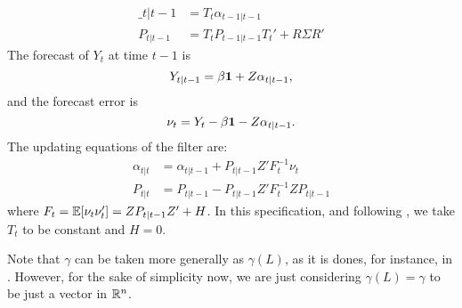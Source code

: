 \begin{align}
	\_{t|t-1} &= T_t \alpha_{t-1|t-1}\\
	P_{t|t-1} &= T_t P_{t-1|t-1}T_t' + R\Sigma R'
\end{align}
The forecast of $Y_t$ at time $t-1$ is $$Y_{t|t-1} = \beta\mathbf{1} + Z\alpha_{t|t-1},$$ and the forecast error is $$\nu_t=Y_t-\beta\mathbf{1} - Z\alpha_{t|t-1}.$$ The updating equations of the filter are:
\begin{align}
	\alpha_{t|t} &= \alpha_{t|t-1} + P_{t|t-1} Z'F_t^{-1}\nu_t\\
	P_{t|t}& = P_{t|t-1} - P_{t|t-1}Z'F_t^{-1} Z P_{t|t-1}
\end{align}
where $F_t = \mathbb{E}[\nu_t\nu_t'] = Z P_{t|t-1}Z' + H$. In this specification, and following , we take $T_t$ to be constant and $H=0$.


Note that $\gamma$ can be taken more generally as $\gamma(L)$, as it is dones, for instance, in . However, for the sake of simplicity now, we are just considering $\gamma(L) = \gamma$ to be just a vector in $\mathbb{R}^n$.